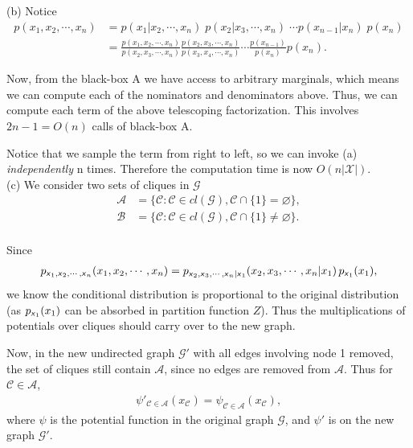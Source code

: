 \documentclass{article}
\newcommand{\s}[1]{\textsf{\textit{#1}}}
\let\emptyset\varnothing
\begin{document}
%
\noindent
(b) Notice
\begin{align*}
p(x_1, x_2, \cdots, x_n) &= p(x_1 | x_2, \cdots, x_n) \; p(x_2 | x_3, \cdots, x_n)\; \cdots
p(x_{n-1}|x_n)\;p(x_n)\\
&= \frac{p(x_1, x_2, \cdots, x_n)}{p(x_2, x_3, \cdots, x_n)}
\frac{p(x_2, x_3, \cdots, x_n)}{p(x_3, x_4, \cdots, x_n)}
\cdots\frac{p(x_{n-1})}{p(x_n)}p(x_n).
\end{align*}

Now, from the black-box A we have access to arbitrary marginals,
which means we can compute each of the nominators and denominators above.
Thus, we can compute each term of the above telescoping factorization.
This involves $2n -1 = O(n)$ calls of black-box A.

Notice that we sample the term from right to left, so we can invoke (a) \emph{independently} n times. Therefore the computation
time is now $O(n|\mathscr{X}|)$.
\\

%
\noindent
(c) We consider two sets of cliques in $\mathscr{G}$
\begin{align*}
\mathcal{A} &= \Big\{\mathscr{C}: \mathscr{C} \in cl(\mathscr{G}), \mathscr{C}\cap\{1\} = \emptyset \Big\},\\
\mathscr{B} &= \Big\{\mathscr{C}: \mathscr{C} \in cl(\mathscr{G}), \mathscr{C}\cap\{1\} \neq \emptyset \Big\}.
\end{align*}
\\
%
Since
\begin{align*}
p_{\s{x}_1, \s{x}_2, \cdots, \s{x}_n}(x_1, x_2, \cdots, x_n) = p_{\s{x}_2, \s{x}_3, \cdots, \s{x}_n | \s{x}_1}(x_2, x_3, \cdots, x_n | x_1) \,p_{\s{x}_1}(x_1),
\end{align*}
we know the conditional distribution is proportional to the original distribution (as $p_{\s{x}_1}(x_1)$ can be absorbed in partition function $Z$). Thus the multiplications of potentials over cliques should carry over to the new graph.

Now, in the new undirected graph $\mathscr{G}'$ with all edges involving node 1 removed, the set of cliques still contain $\mathscr{A}$, since no edges are removed from $\mathscr{A}$. Thus for $\mathscr{C}\in\mathscr{A}$,
\begin{align*}
\psi'_{\mathscr{C}\in\mathscr{A}}(x_{\mathscr{C}}) =
\psi_{\mathscr{C}\in\mathscr{A}}(x_{\mathscr{C}}),	
\end{align*}
where $\psi$ is the potential function in the original graph $\mathscr{G}$, and $\psi'$ is on the new graph $\mathscr{G}'$.
\end{document}
